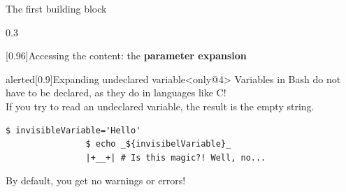 \begin{frame}[fragile]{The first building block}
\begin{overlayarea}{\textwidth}{0.3\textheight}
\begin{varblock}{}[0.96\textwidth]{Accessing the content: the \textbf{parameter expansion}}
        \end{varblock}
        \begin{varblock}{alerted}[0.9\textwidth]{Expanding undeclared variable}<only@4>
            Variables in Bash do not have to be declared, as they do in languages like C!\\
            If you try to read an undeclared variable, the result is the empty string.\\
            \begin{lstlisting}[style=MyBash, numbers=none, aboveskip=3mm, belowskip=-4mm, xleftmargin=20mm, xrightmargin=20mm]
                $ invisibleVariable='Hello'
                $ echo _${invisibelVariable}_
                |+__+| # Is this magic?! Well, no...
            \end{lstlisting}
            \alert{By default, you get no warnings or errors!}
        \end{varblock}
        \PrepareURLsymbol[PB]
    \end{overlayarea}
\end{frame}
